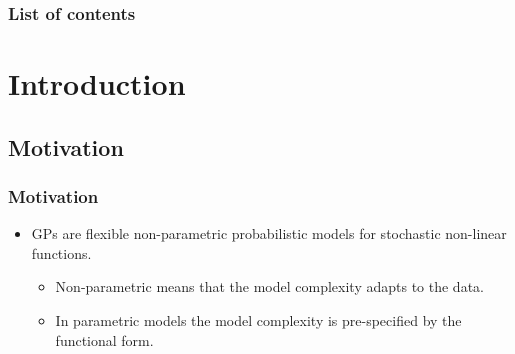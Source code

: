 \documentclass[8pt]{beamer} %
\date{}
\begin{document}
\begin{frame}
\setcounter{tocdepth}{2}
\frametitle{\large \color{black} List of contents}
\tableofcontents
\end{frame}


\section{Introduction}

\subsection*{Motivation}
\begin{frame}[t]
\frametitle{\normalsize \color{black} Motivation}

\vspace{-4mm}
\begin{itemize}\setlength\itemsep{2mm}
\item {\color{navyblue} GPs} are flexible {\color{navyblue} non-parametric probabilistic models} for stochastic non-linear functions.

\begin{itemize}\setlength\itemsep{0.5mm}
\item Non-parametric means that the model complexity adapts to the data.
\item In parametric models the model complexity is pre-specified by the functional form.


\end{itemize}
\end{itemize}
\end{frame}
\end{document}
